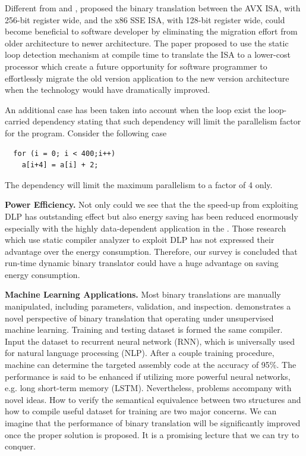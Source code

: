 \documentclass[sigconf, nonacm, natbib=false]{acmart}
\begin{document}
Different from \parencite{exploiting_longer_simd} and \parencite{an_energy_efficient_multitarget}, \parencite{dynamic_revectorization} proposed the binary translation between the AVX ISA, with 256-bit register wide, and the x86 SSE ISA, with 128-bit register wide, could become beneficial to software developer by eliminating the migration effort from older architecture to newer architecture. The paper proposed to use the static loop detection mechanism at compile time to translate the ISA to a lower-cost processor which create a future opportunity for software programmer to effortlessly migrate the old version application to the new version architecture when the technology would have dramatically improved.

An additional case has been taken into account when the loop exist the loop-carried dependency stating that such dependency will limit the parallelism factor for the program. Consider the following case
\begin{verbatim}
  for (i = 0; i < 400;i++)
    a[i+4] = a[i] + 2;
\end{verbatim}
The dependency will limit the maximum parallelism to a factor of 4 only. 

{\bf Power Efficiency.} Not only could we see that the the speed-up from exploiting DLP has outstanding effect but also energy saving has been reduced enormously especially with the highly data-dependent application in the \parencite{boosting_simd}. Those research \parencite{dynamic_revectorization} which use static compiler analyzer to exploit DLP has not expressed their advantage over the energy consumption. Therefore, our survey is concluded that run-time dynamic binary translator could have a huge advantage on saving energy consumption. 

{\bf Machine Learning Applications.} Most binary translations are manually manipulated, including parameters, validation, and inspection. \parencite{neural_machine} demonstrates a novel perspective of binary translation that operating under unsupervised machine learning. Training and testing dataset is formed the same compiler. Input the dataset to recurrent neural network (RNN), which is universally used for natural language processing (NLP). After a couple training procedure, machine can determine the targeted assembly code at the accuracy of 95\%. The performance is said to be enhanced if utilizing more powerful neural networks, e.g. long short-term memory (LSTM). Nevertheless, problems accompany with novel ideas. How to verify the semantical equivalence between two structures and how to compile useful dataset for training are two major concerns. We can imagine that the performance of binary translation will be significantly improved once the proper solution is proposed. It is a promising lecture that we can try to conquer. 
\end{document}
